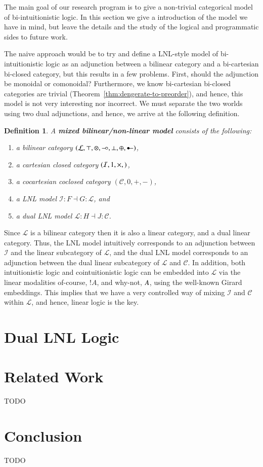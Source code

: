 \documentclass{lmcs}
\newtheorem{definition}[theorem]{Definition}
\let\to\relax
\newcommand{\to}{\rightarrow}
\let\wn\relax
\newcommand{\cat}[1]{\mathcal{#1}}
\newcommand{\limp}[0]{\multimap}
\newcommand{\colimp}[0]{\multimapdotinv}
\newcommand{\wn}[0]{\mathop{?}}
\def\limp{\mathrel{-\!\circ}}
\begin{document}
The main goal of our research program is to give a non-trivial
categorical model of bi-intuitionistic logic.  In this section we give
a introduction of the model we have in mind, but leave the details and
the study of the logical and programmatic sides to future work.

The naive approach would be to try and define a LNL-style model of
bi-intuitionistic logic as an adjunction between a bilinear category
and a bi-cartesian bi-closed category, but this results in a few
problems.  First, should the adjunction be monoidal or comonoidal?
Furthermore, we know bi-cartesian bi-closed categories are trivial
(Theorem~\ref{thm:dengerate-to-preorder}), and hence, this model is
not very interesting nor incorrect.  We must separate the two
worlds using two dual adjunctions, and hence, we arrive at the
following definition.
\begin{definition}
  \label{def:biLNL-model}
  A \textbf{mixed bilinear/non-linear model} consists of the
  following:
  \begin{enumerate}[label=\roman*.]
  \item a bilinear category $(\cat{L},
    \top,\otimes,\limp,\perp,\oplus,\colimp)$,
  \item a cartesian closed category $(\cat{I},1,\times,\to)$,
  \item a cocartesian coclosed category $(\cat{C},0,+,-)$, 
  \item a LNL model $\cat{I} : F \dashv G : \cat{L}$, and
  \item a dual LNL model $\cat{L} : H \dashv J : \cat{C}$.
  \end{enumerate}
\end{definition}
Since $\cat{L}$ is a bilinear category then it is also a linear
category, and a dual linear category.  Thus, the LNL model intuitively
corresponds to an adjunction between $\cat{I}$ and the linear
subcategory of $\cat{L}$, and the dual LNL model corresponds to an
adjunction between the dual linear subcategory of $\cat{L}$ and
$\cat{C}$.  In addition, both intuitionistic logic and
cointuitionistic logic can be embedded into $\cat{L}$ via the linear
modalities of-course, $!A$, and why-not, $\wn A$, using the well-known
Girard embeddings.  This implies that we have a very controlled way of
mixing $\cat{I}$ and $\cat{C}$ within $\cat{L}$, and hence, linear
logic is the key.

\section{Dual LNL Logic}
\label{sec:dual_lnl_logic}



\section{Related Work}
\label{sec:related_work}
TODO


\section{Conclusion}
\label{sec:conclusion}
TODO

 

\appendix

\end{document}

